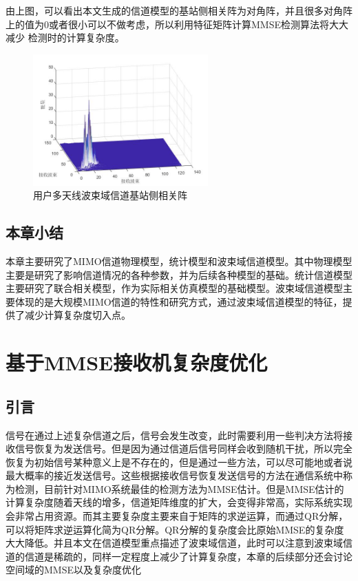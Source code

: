 \documentclass[bachelor,nocolorlinks, printoneside]{seuthesis} %
\begin{document}
\begin{Main}
由上图，可以看出本文生成的信道模型的基站侧相关阵为对角阵，并且很多对角阵上的值为0或者很小可以不做考虑，所以利用特征矩阵计算MMSE检测算法将大大减少
检测时的计算复杂度。

\begin{figure}[htbp!]
	\centering \includegraphics[width=0.6\textwidth]{img/2_4.jpg} \caption{用户多天线波束域信道基站侧相关阵}
\end{figure}


\section{本章小结}
本章主要研究了MIMO信道物理模型，统计模型和波束域信道模型。其中物理模型主要是研究了影响信道情况的各种参数，并为后续各种模型的基础。统计信道模型主要研究了联合相关模型，作为实际相关仿真模型的基础模型。波束域信道模型主要体现的是大规模MIMO信道的特性和研究方式，通过波束域信道模型的特征，提供了减少计算复杂度切入点。

\chapter{基于MMSE接收机复杂度优化}
\section{引言}
信号在通过上述复杂信道之后，信号会发生改变，此时需要利用一些判决方法将接收信号恢复为发送信号。但是因为通过信道后信号同样会收到随机干扰，所以完全恢复为初始信号某种意义上是不存在的，但是通过一些方法，可以尽可能地或者说最大概率的接近发送信号。这些根据接收信号恢复发送信号的方法在通信系统中称为检测，目前针对MIMO系统最佳的检测方法为MMSE估计。但是MMSE估计的计算复杂度随着天线的增多，信道矩阵维度的扩大，会变得非常高，实际系统实现会非常占用资源。而其主要复杂度主要来自于矩阵的求逆运算，而通过QR分解，可以将矩阵求逆运算化简为QR分解。QR分解的复杂度会比原始MMSE的复杂度大大降低。并且本文在信道模型重点描述了波束域信道，此时可以注意到波束域信道的信道是稀疏的，同样一定程度上减少了计算复杂度，本章的后续部分还会讨论空间域的MMSE以及复杂度优化

\end{Main}
\end{document}
